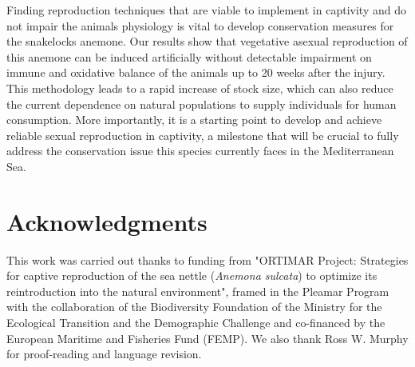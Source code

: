\documentclass[final,3p,times,authoryear]{elsarticle}
\begin{document}
Finding reproduction techniques that are viable to implement in captivity and do not impair the animals physiology is vital to develop conservation measures for the snakelocks anemone. Our results show that vegetative asexual reproduction of this anemone can be induced artificially without detectable impairment on immune and oxidative balance of the animals up to 20 weeks after the injury. This methodology leads to a rapid increase of stock size, which can also reduce the current dependence on natural populations to supply individuals for human consumption. More importantly, it is a starting point to develop and achieve reliable sexual reproduction in captivity, a milestone that will be crucial to fully address the conservation issue this species currently faces in the Mediterranean Sea.


\section*{Acknowledgments}

This work was carried out thanks to funding from "ORTIMAR Project: Strategies for captive reproduction of the sea nettle (\textit{Anemona sulcata}) to optimize its reintroduction into the natural environment", framed in the Pleamar Program with the collaboration of the Biodiversity Foundation of the Ministry for the Ecological Transition and the Demographic Challenge and co-financed by the European Maritime and Fisheries Fund (FEMP). We also thank Ross W. Murphy for proof-reading and language revision.

 

\end{document}
